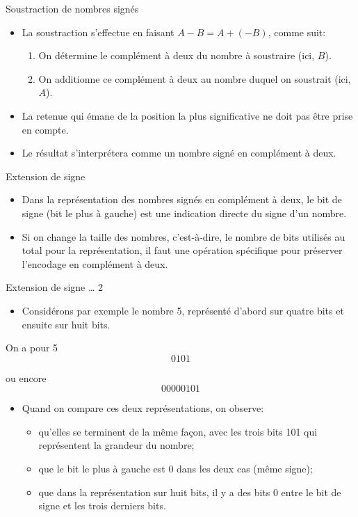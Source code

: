 \documentclass[presentation]{beamer}
\begin{document}
\begin{frame}[label={sec:org2541acb}]{Soustraction de nombres signés}
\begin{itemize}
\item La soustraction s'effectue en faisant \(A - B = A + (-B)\), comme suit:

\begin{enumerate}
\item On détermine le complément à deux du nombre à soustraire (ici, \(B\)).
\item On additionne ce complément à deux au nombre duquel on soustrait  (ici, \(A\)).
\end{enumerate}

\item La retenue qui émane de la position la plus significative ne doit pas être prise en compte.

\item Le résultat s'interprétera comme un nombre signé en complément à deux.
\end{itemize}
\end{frame}

\begin{frame}[label={sec:orgd647a5b}]{Extension de signe}
\begin{itemize}
\item Dans la représentation des nombres signés en complément à deux, le bit de signe (bit le plus à gauche) est une indication directe du signe d'un nombre.

\item Si on change la taille des nombres, c'est-à-dire, le nombre de bits utilisés au total pour la représentation, il faut une opération spécifique pour préserver l'encodage en complément à deux.
\end{itemize}
\end{frame}

\begin{frame}[label={sec:org8b99814}]{Extension de signe \ldots{} 2}
\begin{itemize}
\item Considérons par exemple le nombre 5, représenté d'abord sur quatre bits et ensuite sur huit bits.
\end{itemize}

On a pour 5 $$ 0101 $$

ou encore $$ 00000101 $$

\begin{itemize}
\item Quand on compare ces deux représentations, on observe: 

\begin{itemize}
\item qu'elles se terminent de la même façon, avec les trois bits 101 qui représentent la grandeur du nombre;
\item que le bit le plus à gauche est 0 dans les deux cas (même signe);
\item que dans la représentation sur huit bits, il y a des bits 0 entre le bit  de signe et les trois derniers bits.
\end{itemize}
\end{itemize}
\end{frame}
\end{document}
